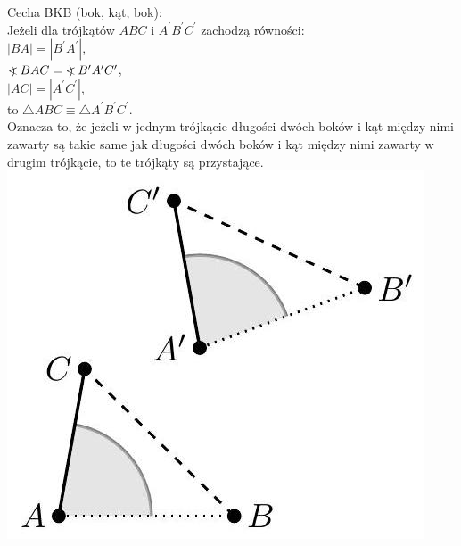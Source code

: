 \documentclass[10pt]{article}
\newcommand\Varangle{\mathop{{<\!\!\!\!\!\text{\small)}}\:}\nolimits}
\begin{document}
Cecha BKB (bok, kąt, bok):\\
Jeżeli dla trójkątów \(A B C\) i \(A^{\prime} B^{\prime} C^{\prime}\) zachodzą równości:\\
\(|B A|=\left|B^{\prime} A^{\prime}\right|\),\\
\(\Varangle B A C=\Varangle B^{\prime} A^{\prime} C^{\prime}\),\\
\(|A C|=\left|A^{\prime} C^{\prime}\right|\),\\
to \(\triangle A B C \equiv \triangle A^{\prime} B^{\prime} C^{\prime}\).\\
Oznacza to, że jeżeli w jednym trójkącie długości dwóch boków i kąt między nimi zawarty są takie same jak długości dwóch boków i kąt między nimi zawarty w drugim trójkącie, to te trójkąty są przystające.\\
\includegraphics[max width=\textwidth, center]{2024_11_21_71f62bd117d375398909g-046}
\end{document}
